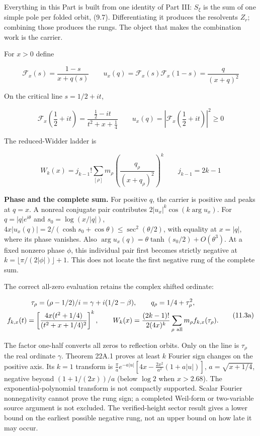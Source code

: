 \documentclass[
  11pt,
]{book}
\begin{document}
Everything in this Part is built from one identity of Part III:
\(S_\xi\) is the sum of one simple pole per folded orbit, (9.7).
Differentiating it produces the resolvents \(Z_r\); combining those
produces the rungs. The object that makes the combination work is the
carrier.

For \(x>0\) define

\[
\mathcal F_x(s)=\frac{1-s}{x+q(s)}
\qquad
u_x(q)=\mathcal F_x(s)\mathcal F_x(1-s)
=\frac{q}{(x+q)^2}
\tag{11.1}
\]

On the critical line \(s=1/2+it\),

\[
\mathcal F_x\!\left(\frac12+it\right)
=\frac{\frac12-it}{t^2+x+\frac14}
\qquad
u_x(q)=\left|\mathcal F_x\!\left(\frac12+it\right)\right|^2\ge0
\tag{11.2}
\]

The reduced-Widder ladder is

\[
\boxed{
W_k(x)=j_{k-1}!\sum_{[\rho]}m_\rho
\left(\frac{q_\rho}{(x+q_\rho)^2}\right)^k
\qquad j_{k-1}=2k-1}
\tag{11.3}
\]

\textbf{Phase and the complete sum.} For positive \(q\), the carrier is
positive and peaks at \(q=x\). A nonreal conjugate pair contributes
\(2|u_x|^k\cos(k\arg u_x)\). For \(q=|q|e^{i\theta}\) and
\(s_0=\log(x/|q|)\),
\(4x|u_x(q)|=2/(\cosh s_0+\cos\theta)\le\sec^2(\theta/2)\), with
equality at \(x=|q|\), where its phase vanishes. Also
\(\arg u_x(q)=\theta\tanh(s_0/2)+O(\theta^3)\). At a fixed nonzero phase
\(\phi\), this individual pair first becomes strictly negative at
\(k=\lfloor\pi/(2|\phi|)\rfloor+1\). This does not locate the first
negative rung of the complete sum.

The correct all-zero evaluation retains the complex shifted ordinate:

\[
\begin{gathered}
\tau_\rho=(\rho-1/2)/i=\gamma+i(1/2-\beta),\qquad
q_\rho=1/4+\tau_\rho^2,\\
f_{k,x}(t)=\left[\frac{4x(t^2+1/4)}{(t^2+x+1/4)^2}\right]^k,\qquad
W_k(x)=\frac{(2k-1)!}{2(4x)^k}\sum_{\rho\ {\rm all}}m_\rho f_{k,x}(\tau_\rho).
\end{gathered}
\tag{11.3a}
\]

The factor one-half converts all zeros to reflection orbits. Only on the
line is \(\tau_\rho\) the real ordinate \(\gamma\). Theorem 22A.1 proves
at least \(k\) Fourier sign changes on the positive axis. Its \(k=1\)
transform is \(\frac\pi a e^{-a|u|}[4x-\frac{2x^2}{a^2}(1+a|u|)]\),
\(a=\sqrt{x+1/4}\), negative beyond \((1+1/(2x))/a\) (below \(\log2\)
when \(x>2.68\)). The exponential-polynomial transform is not compactly
supported. Scalar Fourier nonnegativity cannot prove the rung sign; a
completed Weil-form or two-variable source argument is not excluded. The
verified-height sector result gives a lower bound on the earliest
possible negative rung, not an upper bound on how late it may occur.
\end{document}
